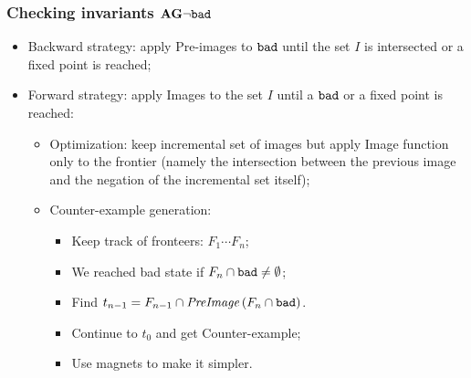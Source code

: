 
    \subsubsection{Checking invariants $\mathcal{\mathcal{\sf \bf A}}\mathcal{\sf \bf G}\neg\mathcal{{\tt bad}}$}
        \begin{itemize}
        \item   Backward strategy: apply Pre-images to $\mathcal{{\tt bad}}$ until the
                set $I$ is intersected or a fixed point is reached;
        \item   Forward strategy: apply Images to the set $I$ until a
                $\mathcal{{\tt bad}}$ or a fixed point is reached:
            \begin{itemize}
            \item   Optimization: keep incremental set of images but apply
                    Image function only to the frontier (namely the
                    intersection between the previous image and the
                    negation of the incremental set itself);
            \item   Counter-example generation:
                \begin{itemize}
                \item   Keep track of fronteers: $F_1 \cdots F_n$;
                \item   We reached bad state if $F_n \cap \mathcal{{\tt bad}}
                        \neq\emptyset$;
                \item   Find $t_{n-1} = F_{n-1} \cap \mbox{\emph{PreImage}}\left({F_n \cap
                        \mathcal{{\tt bad}}}\right)$.
                \item   Continue to $t_0$ and get Counter-example;
                \item   Use magnets to make it simpler.
                \end{itemize}
            \end{itemize}
        \end{itemize}

